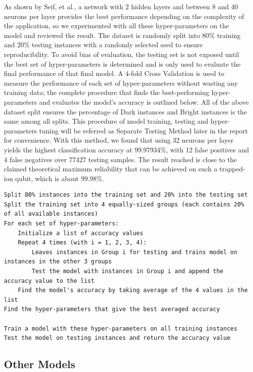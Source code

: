\documentclass[letterpaper,twocolumn,10pt]{article}
\begin{document}
As shown by Seif, et al., a network with 2 hidden layers and between 8 and 40 neurons per layer provides the best performance depending on the complexity of the application, so we experimented with all these hyper-parameters on the model and reviewed the result. The dataset is randomly split into 80\% training and 20\% testing instances with a randomly selected seed to ensure reproducibility. To avoid bias of evaluation, the testing set is not exposed until the best set of hyper-parameters is determined and is only used to evaluate the final performance of that final model. A 4-fold Cross Validation is used to measure the performance of each set of hyper-parameters without wasting any training data; the complete procedure that finds the best-performing hyper-parameters and evaluates the model's accuracy is outlined below. All of the above dataset split ensures the percentage of Dark instances and Bright instances is the same among all splits. This procedure of model training, testing and hyper-parameters tuning will be referred as Separate Testing Method later in the report for convenience. With this method, we found that using 32 neurons per layer yields the highest classification accuracy at 99.97934\%, with 12 false positives and 4 false negatives over 77427 testing samples. The result reached is close to the claimed theoretical maximum reliability that can be achieved on such a trapped-ion qubit, which is about 99.98\%.

\begin{lstlisting}[basicstyle=\small]
Split 80% instances into the training set and 20% into the testing set
Split the training set into 4 equally-sized groups (each contains 20% of all available instances)
For each set of hyper-parameters:
    Initialize a list of accuracy values
    Repeat 4 times (with i = 1, 2, 3, 4):
        Leaves instances in Group i for testing and trains model on instances in the other 3 groups
        Test the model with instances in Group i and append the accuracy value to the list
    Find the model's accuracy by taking average of the 4 values in the list
Find the hyper-parameters that give the best averaged accuracy

Train a model with these hyper-parameters on all training instances
Test the model on testing instances and return the accuracy value
\end{lstlisting}

\subsection{Other Models}
\end{document}
